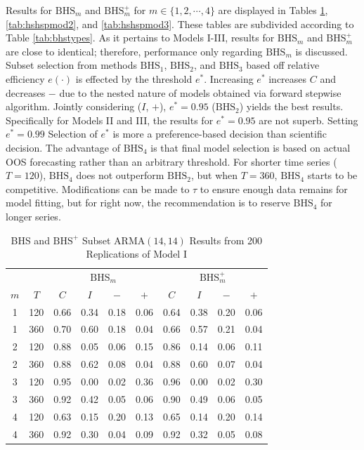 Results for $\textrm{BHS}_m$ and $\textrm{BHS}^+_m$ for $m \in \{1,2,\cdots,4\}$ are displayed in Tables \ref{tab:hshspmod1}, \ref{tab:hshspmod2}, and \ref{tab:hshspmod3}. These tables are subdivided according to Table \ref{tab:bhstypes}. As it pertains to Models I-III, results for $\textrm{BHS}_m$ and $\textrm{BHS}^+_m$ are close to identical; therefore, performance only regarding $\textrm{BHS}_m$ is discussed. Subset selection from methods $\textrm{BHS}_1$, $\textrm{BHS}_2$, and $\textrm{BHS}_3$ based off relative efficiency $e(\cdot)$ is effected by the threshold $e^*$. Increasing $e^*$ increases $C$ and decreases $-$ due to the nested nature of models obtained via forward stepwise algorithm. Jointly considering ($I$, $+$), $e^*=0.95$ ($\textrm{BHS}_2$) yields the best results. Specifically for Models II and III, the results for $e^*=0.95$ are not superb. Setting $e^*=0.99$ Selection of $e^*$ is more a preference-based decision than scientific decision. The advantage of $\textrm{BHS}_4$ is that final model selection is based on actual OOS forecasting rather than an arbitrary threshold. For shorter time series ($T=120$), $\textrm{BHS}_4$ does not outperform $\textrm{BHS}_2$, but when $T=360$, $\textrm{BHS}_4$ starts to be competitive. Modifications can be made to $\tau$ to ensure enough data remains for model fitting, but for right now, the recommendation is to reserve $\textrm{BHS}_4$ for longer series.


\begin{table}[ht!]
\footnotesize
\centering
\caption{BHS and $\textrm{BHS}^+$ Subset ARMA$(14,14)$ Results from 200 Replications of Model I}
\begin{tabular}{cc|cccc|cccc}
  \hline
  & & \multicolumn{4}{c|}{$\textrm{BHS}_m$} & \multicolumn{4}{c}{$\textrm{BHS}^+_m$} \\
  \cline{4-5}  \cline{8-9}
  $m$ & $T$ & $C$ & $I$ & $-$ & $+$ & $C$ & $I$ & $-$ & $+$ \\
  \hline
  1 & 120 & 0.66 & 0.34 & 0.18 & 0.06 & 0.64 & 0.38 & 0.20 & 0.06 \\ 
  1 & 360 & 0.70 & 0.60 & 0.18 & 0.04 & 0.66 & 0.57 & 0.21 & 0.04 \\ 
  2 & 120 & 0.88 & 0.05 & 0.06 & 0.15 & 0.86 & 0.14 & 0.06 & 0.11 \\ 
  2 & 360 & 0.88 & 0.62 & 0.08 & 0.04 & 0.88 & 0.60 & 0.07 & 0.04 \\ 
  3 & 120 & 0.95 & 0.00 & 0.02 & 0.36 & 0.96 & 0.00 & 0.02 & 0.30 \\ 
  3 & 360 & 0.92 & 0.42 & 0.05 & 0.06 & 0.90 & 0.49 & 0.06 & 0.05 \\ 
  \hline
  4 & 120 & 0.63 & 0.15 & 0.20 & 0.13 & 0.65 & 0.14 & 0.20 & 0.14 \\ 
  4 & 360 & 0.92 & 0.30 & 0.04 & 0.09 & 0.92 & 0.32 & 0.05 & 0.08 \\ 
   \hline
\end{tabular}
\label{tab:hshspmod1}
\end{table}



